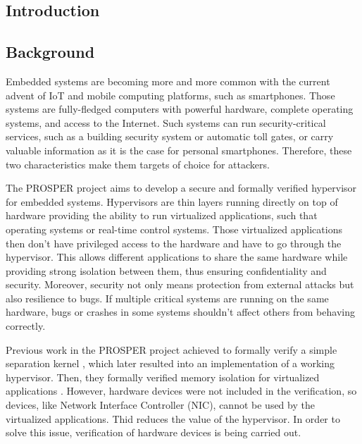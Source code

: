 \documentclass[10pt,a4paper]{article}
\begin{document}
\begin{multicols}{2}


\section{Introduction}

\subsection{Background}

Embedded systems are becoming more and more common with the current advent of {IoT} and mobile computing platforms, such as smartphones. Those systems are fully-fledged computers with powerful hardware, complete operating systems, and access to the Internet. Such systems can run security-critical services, such as a building security system or automatic toll gates, or carry valuable information as it is the case for personal smartphones. Therefore, these two characteristics make them targets of choice for attackers.

The {PROSPER} project \cite{noauthor_prosper:_nodate-1} aims to develop a secure and formally verified hypervisor for embedded systems. Hypervisors are thin layers running directly on top of hardware providing the ability to run virtualized applications, such that operating systems or real-time control systems. Those virtualized applications then don't have privileged access to the hardware and have to go through the hypervisor. This allows different applications to share the same hardware while providing strong isolation between them, thus ensuring confidentiality and security. Moreover, security not only means protection from external attacks but also resilience to bugs. If multiple critical systems are running on the same hardware, bugs or crashes in some systems shouldn't affect others from behaving correctly.

Previous work in the {PROSPER} project achieved to formally verify a simple separation kernel \cite{dam_formal_2013}, which later resulted into an implementation of a working hypervisor. Then, they formally verified memory isolation for virtualized applications \cite{nemati_trustworthy_2015}. However, hardware devices were not included in the verification, so devices, like Network Interface Controller ({NIC}), cannot be used by the virtualized applications. Thid reduces the value of the hypervisor. In order to solve this issue, verification of hardware devices is being carried out.


\end{multicols}
\end{document}
